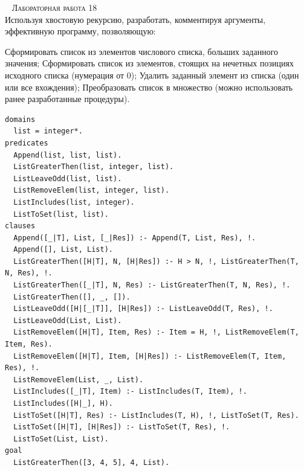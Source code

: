 ~\newpage
\textsc{\huge Лабораторная работа 18} \\
Используя хвостовую рекурсию, разработать, комментируя аргументы,
эффективную программу, позволяющую:
\begin{tasks}
	\task Сформировать список из элементов числового списка, больших заданного
	значения;
	\task Сформировать список из элементов, стоящих на нечетных позициях исходного списка (нумерация от 0);
	\task Удалить заданный элемент из списка (один или все вхождения);
	\task Преобразовать список в множество (можно использовать ранее разработанные процедуры).
\end{tasks}
\begin{lstlisting}
domains
  list = integer*.
predicates
  Append(list, list, list).
  ListGreaterThen(list, integer, list).
  ListLeaveOdd(list, list).
  ListRemoveElem(list, integer, list).
  ListIncludes(list, integer).
  ListToSet(list, list).
clauses
  Append([_|T], List, [_|Res]) :- Append(T, List, Res), !.
  Append([], List, List).
  ListGreaterThen([H|T], N, [H|Res]) :- H > N, !, ListGreaterThen(T, N, Res), !.
  ListGreaterThen([_|T], N, Res) :- ListGreaterThen(T, N, Res), !.
  ListGreaterThen([], _, []).
  ListLeaveOdd([H|[_|T]], [H|Res]) :- ListLeaveOdd(T, Res), !.
  ListLeaveOdd(List, List).
  ListRemoveElem([H|T], Item, Res) :- Item = H, !, ListRemoveElem(T, Item, Res).
  ListRemoveElem([H|T], Item, [H|Res]) :- ListRemoveElem(T, Item, Res), !.
  ListRemoveElem(List, _, List).
  ListIncludes([_|T], Item) :- ListIncludes(T, Item), !.
  ListIncludes([H|_], H).
  ListToSet([H|T], Res) :- ListIncludes(T, H), !, ListToSet(T, Res).
  ListToSet([H|T], [H|Res]) :- ListToSet(T, Res), !.
  ListToSet(List, List).
goal
  ListGreaterThen([3, 4, 5], 4, List).
\end{lstlisting}

